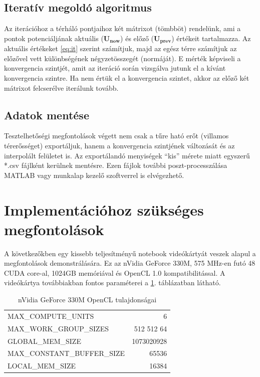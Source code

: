 	
\subsection{Iteratív megoldó algoritmus}
	Az iterációhoz a térháló pontjaihoz két mátrixot (tömbböt) rendelünk, ami a
	pontok potenciáljának aktuális ($\mathbf{U_{now}}$) és előző ($\mathbf{U_{prev}}$)
	értékeit tartalmazza.
	Az aktuális értékeket \eqref{eq:it} szerint számítjuk, majd az egész térre
	számítjuk az előzővel vett különbségének négyzetösszegét (normáját). E mérték
	képviseli a konvergencia szintjét, amit az iteráció során vizsgálva jutunk el a
	kívánt konvergencia szintre.
	Ha nem értük el a konvergencia szintet, akkor az előző két mátrixot
	felcserélve iterálunk tovább.
	
\subsection{Adatok mentése}
	Tesztelhetőségi megfontolások végett nem csak a tűre ható erőt (villamos
	térerősséget) exportáljuk, hanem a konvergencia szintjének változását és az
	interpolált felületet is. Az exportálandó menyiségek ``kis''
	mérete miatt egyszerű *.csv fájlként kerülnek mentésre. Ezen fájlok további
	poszt-processzálása MATLAB vagy munkalap kezelő szoftverrel is elvégezhető.

\section{Implementációhoz szükséges megfontolások}
	
	A következőkben egy kissebb teljesítményű notebook videókártyát veszek
	alapul a megfontolások demonstrálására. Ez az nVidia GeForce 330M, 
	575 MHz-en futó 48 CUDA core-al, 1024GB memóriával és
	OpenCL 1.0 kompatibilitással.
	A videókártya továbbiakban fontos paraméterei a \ref{table:vcard}. táblázatban
	látható.
	
	\begin{table}[!h]
	\renewcommand{\arraystretch}{1.3}
	\caption{nVidia GeForce 330M OpenCL tulajdonságai}
	\label{table:vcard}
	\centering
	\begin{tabular}{l|r}
		MAX\_COMPUTE\_UNITS & 6\\
		MAX\_WORK\_GROUP\_SIZES & 512 512 64\\
		GLOBAL\_MEM\_SIZE & 1073020928\\
		MAX\_CONSTANT\_BUFFER\_SIZE & 65536\\
		LOCAL\_MEM\_SIZE & 16384
	\end{tabular}
	\end{table}
	
